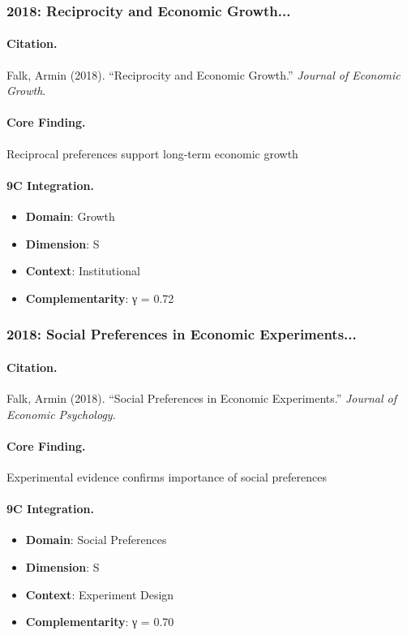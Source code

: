 \subsubsection{2018: Reciprocity and Economic Growth...}

\paragraph{Citation.}
Falk, Armin (2018). ``Reciprocity and Economic Growth.''
\textit{Journal of Economic Growth}.

\paragraph{Core Finding.}
Reciprocal preferences support long-term economic growth

\paragraph{9C Integration.}
\begin{itemize}[nosep]
  \item \textbf{Domain}: Growth
  \item \textbf{Dimension}: S
  \item \textbf{Context}: Institutional
  \item \textbf{Complementarity}: γ = 0.72
\end{itemize}


\subsubsection{2018: Social Preferences in Economic Experiments...}

\paragraph{Citation.}
Falk, Armin (2018). ``Social Preferences in Economic Experiments.''
\textit{Journal of Economic Psychology}.

\paragraph{Core Finding.}
Experimental evidence confirms importance of social preferences

\paragraph{9C Integration.}
\begin{itemize}[nosep]
  \item \textbf{Domain}: Social Preferences
  \item \textbf{Dimension}: S
  \item \textbf{Context}: Experiment Design
  \item \textbf{Complementarity}: γ = 0.70
\end{itemize}


